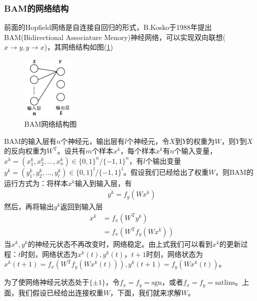 {        \subsubsection{BAM的网络结构}
            \par
            前面的Hopfield网络是自连接自回归的形式，B.Kosko于1988年提出BAM(Bidirectional Associature Menory)神经网络，可以实现双向联想($x\to y,y\to x$)，其网络结构如图(\ref{fig:BAM网络结构图})
            \begin{figure}[H]
            \centering
            \includegraphics[height=3cm]{images/BAM_network_structure.jpg}
            \caption{BAM网络结构图}
            \label{fig:BAM网络结构图}
            \end{figure}
            BAM的输入层有$n$个神经元，输出层有$l$个神经元，令$X$到$Y$的权重为$W$，则$Y$到$X$的反向权重为$W^\mathrm{T}$。设共有$m$个样本$x^k$，每个样本$x^k$有$n$个输入变量，$x^k = (x_1^k,x_2^k,\dots,x_n^k)\in \{0,1\}^n/\{-1,1\}^n$，有$l$个输出变量$y^k=(y_1^k,y_2^k,\dots,y_l^k)\in \{0,1\}^l/\{-1,1\}^l$。假设我们已经给出了权重$W$，则BAM的运行方式为：将样本$x^k$输入到输入层，有
            \begin{align*}
            y^k = f_y(W x^k)
            \end{align*}
            然后，再将输出$y^k$返回到输入层
            \begin{align*}
            x^k & = f_x(W^\mathrm{T}y^k)\\
            & = f_x \left( W^\mathrm{T}f_y(W x^k) \right)
            \end{align*}
            当$x^k,y^k$的神经元状态不再改变时，网络稳定。由上式我们可以看到$x^k$的更新过程：$t$时刻，网络状态为$x^k(t),y^k(t)$，$t+1$时刻，网络状态为$x^k(t+1) = f_x \left( W^\mathrm{T}f_y(W x^k(t)) \right) ,y^k(t+1) = f_y(W x^k(t))$。
            \par
            为了使网络神经元状态处于$\{\pm 1\}$，令$f_x = f_y = \mathrm{sgn}$，或者$f_x = f_y = \mathrm{satlins}$。上面，我们假设已经给出连接权重$W$，下面，我们就来求解$W$。
}
